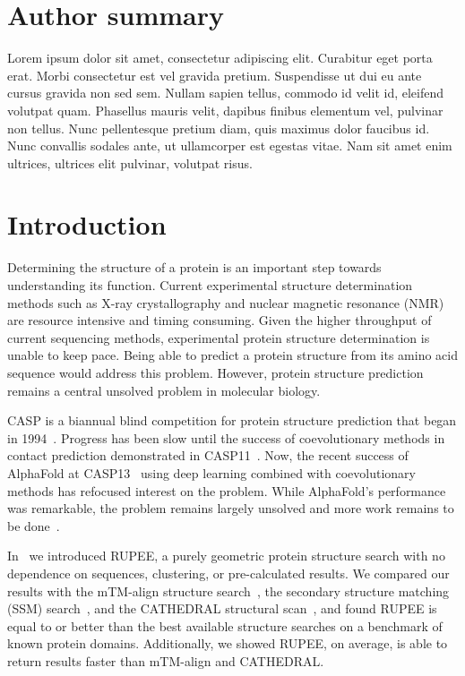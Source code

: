 \documentclass[10pt,letterpaper]{article}
\begin{document}
\section*{Author summary}
Lorem ipsum dolor sit amet, consectetur adipiscing elit. Curabitur eget porta erat. Morbi consectetur est vel gravida pretium. Suspendisse ut dui eu ante cursus gravida non sed sem. Nullam sapien tellus, commodo id velit id, eleifend volutpat quam. Phasellus mauris velit, dapibus finibus elementum vel, pulvinar non tellus. Nunc pellentesque pretium diam, quis maximus dolor faucibus id. Nunc convallis sodales ante, ut ullamcorper est egestas vitae. Nam sit amet enim ultrices, ultrices elit pulvinar, volutpat risus.

\linenumbers

\section*{Introduction}

Determining the structure of a protein is an important step towards understanding its function.
Current experimental structure determination methods such as X-ray crystallography and nuclear magnetic resonance (NMR) are resource intensive and timing consuming.
Given the higher throughput of current sequencing methods, experimental protein structure determination is unable to keep pace.
Being able to predict a protein structure from its amino acid sequence would address this problem. 
However, protein structure prediction remains a central unsolved problem in molecular biology. 

CASP is a biannual blind competition for protein structure prediction that began in 1994~\cite{Moult1995}.
Progress has been slow until the success of coevolutionary methods in contact prediction demonstrated in CASP11~\cite{Moult2016}.
Now, the recent success of AlphaFold at CASP13~\cite{alq2019} using deep learning combined with coevolutionary methods has refocused interest on the problem. 
While AlphaFold's performance was remarkable, the problem remains largely unsolved and more work remains to be done~\cite{alq2019}. 

In~\cite{Ayoub2019} we introduced RUPEE, a purely geometric protein structure search with no dependence on sequences, clustering, or pre-calculated results. 
We compared our results with the mTM-align structure search~\cite{Dong2018}, the secondary structure matching (SSM) search~\cite{Krissinel2004}, and the CATHEDRAL structural scan~\cite{Redfern2007}, and found RUPEE is equal to or better than the best available structure searches on a benchmark of known protein domains. 
Additionally, we showed RUPEE, on average, is able to return results faster than mTM-align and CATHEDRAL. 
\end{document}
